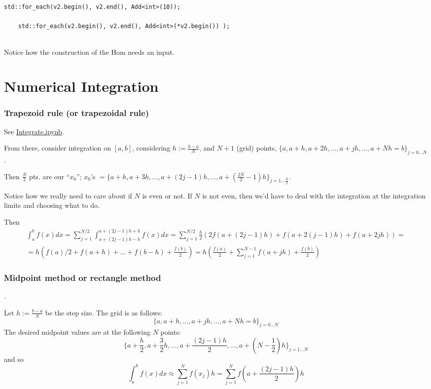 \documentclass[10pt]{amsart}
\begin{document}
\begin{multicols*}{2}
\begin{lstlisting}
std::for_each(v2.begin(), v2.end(), Add<int>(10));

	std::for_each(v2.begin(), v2.end(), Add<int>(*v2.begin()) );
        
\end{lstlisting}
Notice how the construction of the $\text{Hom}$ needs an input.  


\section{Numerical Integration}

\subsubsection{Trapezoid rule (or trapezoidal rule)}

See \href{https://github.com/ernestyalumni/CompPhys/blob/master/Cpp/Integrate.ipynb}{Integrate.ipynb}.

From there, consider integration on $[a,b]$, considering $h := \frac{b-a}{N}$, and $N+1$ (grid) points, $\lbrace a, a+h, a+2h, \dots , a+ jh, \dots , a+Nh = b\rbrace_{j=0 \dots N }$.

Then $\frac{N}{2}$ pts. are our ``$x_0$''; $x_0$'s $= \lbrace a +h , a+3h, \dots , a+(2j-1)h, \dots , a+ \left( \frac{2 N}{2} - 1 \right)h \rbrace_{j=1 \dots \frac{N}{2} }$.

Notice how we really need to care about if $N$ is even or not.  If $N$ is not even, then we'd have to deal with the integration at the integration limits and choosing what to do.  

Then
\[
\begin{gathered}
  \int_a^b f(x) dx = \sum_{j=1}^{N/2} \int_{a + (2j-1)h-h}^{a+(2j-1)h+h} f(x)dx = \sum_{j=1}^{N/2} \frac{h}{2} ( 2f(a+(2j-1)h ) + f(a+2(j-1)h) + f(a+2jh) ) = \\
   = h(f(a)/2 + f(a+h) + \dots + f(b-h) + \frac{f(b)}{2} ) = h \left( \frac{f(a)}{2} + \sum_{j=1}^{N-1} f(a+jh) + \frac{f(b)}{2} \right)
  \end{gathered}
\]

\subsubsection{Midpoint method or rectangle method}.

Let $h := \frac{b-a}{N}$ be the step size.  The grid is as follows:
\[
\lbrace a , a +h , \dots , a + jh , \dots , a+Nh = b\rbrace_{j=0\dots N}
\]
The desired midpoint values are at the following $N$ points:
\[
\lbrace a + \frac{h}{2} , a + \frac{3}{2} h , \dots , a+\frac{(2j-1 ) h }{2} , \dots , a + \left( N - \frac{1}{2} \right) h \rbrace_{j=1 \dots N}
\]
and so
\begin{equation}
  \int_a^b f(x) dx \approx \sum_{j=1}^N f(x_j) h = \sum_{j=1}^N f\left( a + \frac{(2j-1) h}{2} \right)h 
\end{equation}



\end{multicols*}
\end{document}
